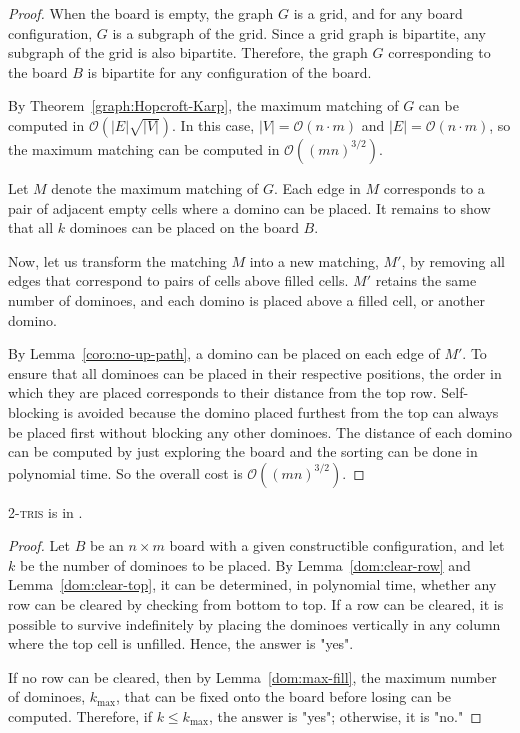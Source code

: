 \begin{proof}
  \vspace{1em}
  
  When the board is empty, the graph \( G \) is a grid, and for any board configuration, \( G \) is a subgraph of the grid. Since a grid graph is bipartite, any subgraph of the grid is also bipartite. Therefore, the graph \( G \) corresponding to the board \( B \) is bipartite for any configuration of the board.

  By Theorem~\ref{graph:Hopcroft-Karp}, the maximum matching of \( G \) can be computed in \( \mathcal{O}(|E| \sqrt{|V|}) \). In this case, \( |V| = \mathcal{O}(n \cdot m) \) and \( |E| = \mathcal{O}(n \cdot m) \), so the maximum matching can be computed in \( \mathcal{O}((mn)^{3/2}) \).

  Let \( M \) denote the maximum matching of \( G \). Each edge in \( M \) corresponds to a pair of adjacent empty cells where a domino can be placed. It remains to show that all \( k \) dominoes can be placed on the board \( B \).

  Now, let us transform the matching \( M \) into a new matching, \( M' \), by removing all edges that correspond to pairs of cells above filled cells. \( M' \) retains the same number of dominoes, and each domino is placed above a filled cell, or another domino.

  By Lemma~\ref{coro:no-up-path}, a domino can be placed on each edge of \( M' \). To ensure that all dominoes can be placed in their respective positions, the order in which they are placed corresponds to their distance from the top row. Self-blocking is avoided because the domino placed furthest from the top can always be placed first without blocking any other dominoes. The distance of each domino can be computed by just exploring the board and the sorting can be done in polynomial time. So the overall cost is \( \mathcal{O}((mn)^{3/2}) \).

\end{proof}

\begin{theorem}
  \textsc{2-tris} \survival is in \pp.
\end{theorem}

\begin{proof}
  Let \( B \) be an \( n \times m \) board with a given constructible configuration, and let \( k \) be the number of dominoes to be placed. By Lemma~\ref{dom:clear-row} and Lemma~\ref{dom:clear-top}, it can be determined, in polynomial time, whether any row can be cleared by checking from bottom to top. If a row can be cleared, it is possible to survive indefinitely by placing the dominoes vertically in any column where the top cell is unfilled. Hence, the answer is "yes".

  If no row can be cleared, then by Lemma~\ref{dom:max-fill}, the maximum number of dominoes, \( k_{\text{max}} \), that can be fixed onto the board before losing can be computed. Therefore, if \( k \leq k_{\text{max}} \), the answer is "yes"; otherwise, it is "no."
\end{proof}

